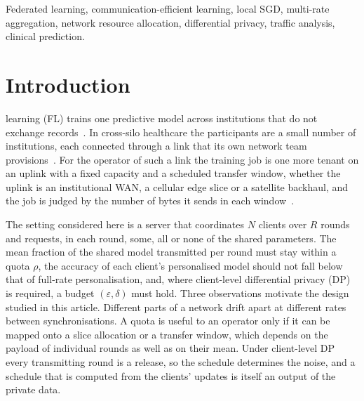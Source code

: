 \documentclass[journal]{IEEEtran}
\begin{document}
\begin{IEEEkeywords}
Federated learning, communication-efficient learning, local SGD, multi-rate aggregation, network resource allocation, differential privacy, traffic analysis, clinical prediction.
\end{IEEEkeywords}

\section{Introduction}
\label{sec:intro}

 learning (FL) trains one predictive model across institutions that do not exchange records~\cite{mcmahan2017,kairouz2021}. In cross-silo healthcare the participants are a small number of institutions, each connected through a link that its own network team provisions~\cite{rieke2020,dayan2021}. For the operator of such a link the training job is one more tenant on an uplink with a fixed capacity and a scheduled transfer window, whether the uplink is an institutional WAN, a cellular edge slice or a satellite backhaul, and the job is judged by the number of bytes it sends in each window~\cite{lim2020,chen2021joint}.

The setting considered here is a server that coordinates $N$ clients over $R$ rounds and requests, in each round, some, all or none of the shared parameters. The mean fraction of the shared model transmitted per round must stay within a quota $\rho$, the accuracy of each client's personalised model should not fall below that of full-rate personalisation, and, where client-level differential privacy (DP) is required, a budget $(\varepsilon,\delta)$ must hold. Three observations motivate the design studied in this article. Different parts of a network drift apart at different rates between synchronisations. A quota is useful to an operator only if it can be mapped onto a slice allocation or a transfer window, which depends on the payload of individual rounds as well as on their mean. Under client-level DP every transmitting round is a release, so the schedule determines the noise, and a schedule that is computed from the clients' updates is itself an output of the private data.
\end{document}
